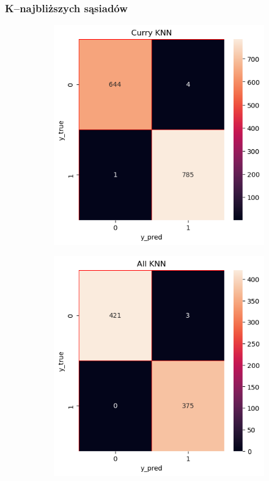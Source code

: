 \documentclass{beamer}
\begin{document}
\begin{frame}
	\frametitle{K--najbliższych sąsiadów}
	\begin{figure}
		\begin{subfigure}[b]{0.45\textwidth}
			\includegraphics[width=\linewidth, height=0.45\textheight]{E_KNN1.png}
		\end{subfigure}
		\begin{subfigure}[b]{0.45\textwidth}
			\includegraphics[width=\linewidth, height=0.45\textheight]{E_KNN_all.png}
		\end{subfigure}
		

\end{figure}
\end{frame}
\end{document}
